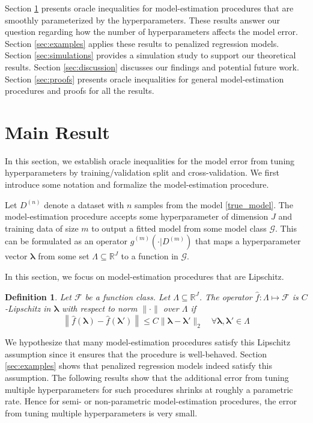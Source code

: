 \documentclass[12pt]{article}
\newtheorem{definition}{Definition}
\begin{document}
Section \ref{sec:main_results} presents oracle inequalities for model-estimation procedures that are smoothly parameterized by the hyperparameters. These results answer our question regarding how the number of hyperparameters affects the model error.
Section \ref{sec:examples} applies these results to penalized regression models.
Section \ref{sec:simulations} provides a simulation study to support our theoretical results.
Section \ref{sec:discussion} discusses our findings and potential future work.
Section \ref{sec:proofs} presents oracle inequalities for general model-estimation procedures and proofs for all the results.


\section{Main Result} \label{sec:main_results}

In this section, we establish oracle inequalities for the model error from tuning hyperparameters by  training/validation split and cross-validation.
We first introduce some notation and formalize the model-estimation procedure. 

Let $D^{(n)}$ denote a dataset with $n$ samples from the model \eqref{true_model}. The model-estimation procedure accepts some hyperparameter of dimension $J$ and training data of size $m$ to output a fitted model from some model class $\mathcal{G}$. This can be formulated as an operator $\hat{g}^{(m)}(\cdot | D^{(m)})$ that maps a hyperparameter vector $\boldsymbol{\lambda}$ from some set $\Lambda \subseteq \mathbb{R}^J$ to a function in $\mathcal{G}$. 

In this section, we focus on model-estimation procedures that are Lipschitz.
\begin{definition}
	\label{def:smooth_funcs}
	Let $\mathcal{F}$ be a function class. Let $\Lambda \subseteq \mathbb{R}^J$.
	The operator $\hat{f}: \Lambda \mapsto \mathcal{F}$ is $C$-Lipschitz in $\boldsymbol{\lambda}$ with respect to norm $\| \cdot \|$ over $\Lambda$ if
	\begin{equation}
	\left \| \hat{f}(\boldsymbol \lambda) - \hat{f}(\boldsymbol \lambda ') \right \|
	\le
	C \| \boldsymbol \lambda - \boldsymbol \lambda' \|_2 
	\quad
	\forall \boldsymbol \lambda,\boldsymbol \lambda' \in \Lambda
	\label{eq:smooth_funcs}
	\end{equation}
\end{definition}
We hypothesize that many model-estimation procedures satisfy this Lipschitz assumption since it ensures that the procedure is well-behaved. Section \ref{sec:examples} shows that penalized regression models indeed satisfy this assumption. The following results show that the additional error from tuning multiple hyperparameters for such procedures shrinks at roughly a parametric rate. Hence for semi- or non-parametric model-estimation procedures, the error from tuning multiple hyperparameters is very small.
\end{document}
